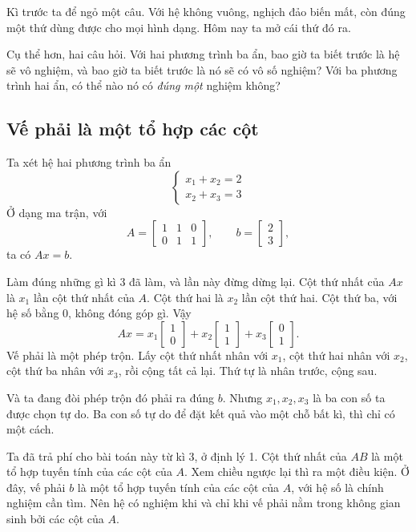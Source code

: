 \documentclass[12pt,a4paper]{article}
\begin{document}
Kì trước ta để ngỏ một câu. Với hệ không vuông, nghịch đảo biến mất, còn đúng một thứ dùng được cho mọi hình dạng. Hôm nay ta mở cái thứ đó ra.

Cụ thể hơn, hai câu hỏi. Với hai phương trình ba ẩn, bao giờ ta biết trước là hệ sẽ vô nghiệm, và bao giờ ta biết trước là nó sẽ có vô số nghiệm? Với ba phương trình hai ẩn, có thể nào nó có \emph{đúng một} nghiệm không?

\subsection{Vế phải là một tổ hợp các cột}

Ta xét hệ hai phương trình ba ẩn
$$
\begin{cases}
x_1+x_2=2\\
x_2+x_3=3
\end{cases}
$$
Ở dạng ma trận, với
$$
A=\left[ \begin{array}{rrr} 1&1&0\\ 0&1&1 \end{array} \right],
\qquad
b=\left[ \begin{array}{r} 2\\ 3 \end{array} \right],
$$
ta có \(Ax=b\).

Làm đúng những gì kì 3 đã làm, và lần này đừng dừng lại. Cột thứ nhất của \(Ax\) là \(x_1\) lần cột thứ nhất của \(A\). Cột thứ hai là \(x_2\) lần cột thứ hai. Cột thứ ba, với hệ số bằng \(0\), không đóng góp gì. Vậy
$$
Ax=x_1\left[ \begin{array}{r} 1\\ 0 \end{array} \right]
+x_2\left[ \begin{array}{r} 1\\ 1 \end{array} \right]
+x_3\left[ \begin{array}{r} 0\\ 1 \end{array} \right].
$$
Vế phải là một phép trộn. Lấy cột thứ nhất nhân với \(x_1\), cột thứ hai nhân với \(x_2\), cột thứ ba nhân với \(x_3\), rồi cộng tất cả lại. Thứ tự là nhân trước, cộng sau.

Và ta đang đòi phép trộn đó phải ra đúng \(b\). Nhưng \(x_1,x_2,x_3\) là ba con số ta được chọn tự do. Ba con số tự do để đặt kết quả vào một chỗ bất kì, thì chỉ có một cách.

Ta đã trả phí cho bài toán này từ kì 3, ở định lý 1. Cột thứ nhất của \(AB\) là một tổ hợp tuyến tính của các cột của \(A\). Xem chiều ngược lại thì ra một điều kiện. Ở đây, vế phải \(b\) là một tổ hợp tuyến tính của các cột của \(A\), với hệ số là chính nghiệm cần tìm. Nên hệ có nghiệm khi và chỉ khi vế phải nằm trong không gian sinh bởi các cột của \(A\).
\end{document}
